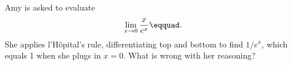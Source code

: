 Amy is asked to evaluate
\begin{equation*}
  \lim_{x\rightarrow 0} \frac{x}{e^x}\eqquad.
\end{equation*}
She applies l'H\^{o}pital's rule, differentiating top and bottom to find
$1/e^x$, which equals 1 when she plugs in $x=0$. What is wrong with her reasoning?
